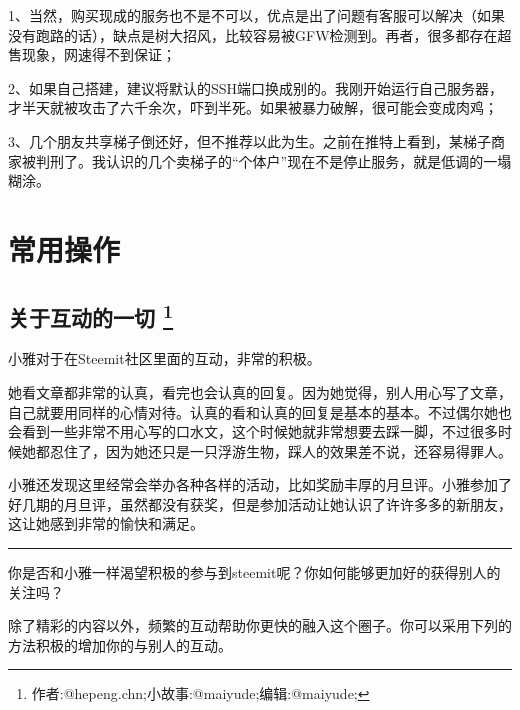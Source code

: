 \documentclass[]{ctexbook}
\begin{document}
1、当然，购买现成的服务也不是不可以，优点是出了问题有客服可以解决（如果没有跑路的话），缺点是树大招风，比较容易被GFW检测到。再者，很多都存在超售现象，网速得不到保证；

2、如果自己搭建，建议将默认的SSH端口换成别的。我刚开始运行自己服务器，才半天就被攻击了六千余次，吓到半死。如果被暴力破解，很可能会变成肉鸡；

3、几个朋友共享梯子倒还好，但不推荐以此为生。之前在推特上看到，某梯子商家被判刑了。我认识的几个卖梯子的``个体户''现在不是停止服务，就是低调的一塌糊涂。

\hypertarget{cyczp}{%
\chapter{常用操作}\label{cyczp}}

\section[关于互动的一切 ]{\texorpdfstring{关于互动的一切 \footnote{作者:@hepeng.chn;小故事:@maiyude;编辑:@maiyude;}}{关于互动的一切 }}

小雅对于在Steemit社区里面的互动，非常的积极。

她看文章都非常的认真，看完也会认真的回复。因为她觉得，别人用心写了文章，自己就要用同样的心情对待。认真的看和认真的回复是基本的基本。不过偶尔她也会看到一些非常不用心写的口水文，这个时候她就非常想要去踩一脚，不过很多时候她都忍住了，因为她还只是一只浮游生物，踩人的效果差不说，还容易得罪人。

小雅还发现这里经常会举办各种各样的活动，比如奖励丰厚的月旦评。小雅参加了好几期的月旦评，虽然都没有获奖，但是参加活动让她认识了许许多多的新朋友，这让她感到非常的愉快和满足。

\begin{center}\rule{0.5\linewidth}{\linethickness}\end{center}

你是否和小雅一样渴望积极的参与到steemit呢？你如何能够更加好的获得别人的关注吗？

除了精彩的内容以外，频繁的互动帮助你更快的融入这个圈子。你可以采用下列的方法积极的增加你的与别人的互动。
\end{document}
